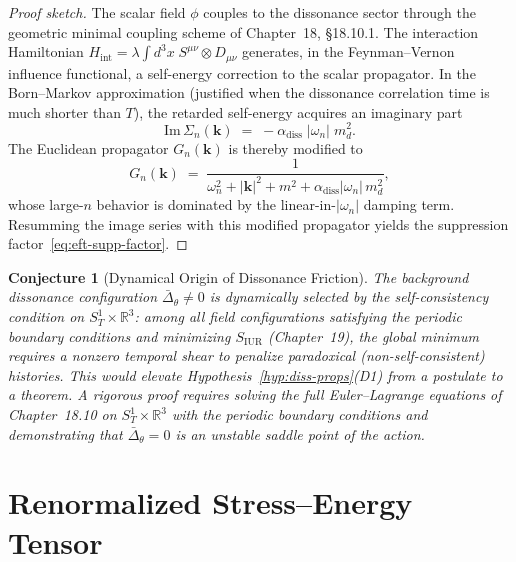 \documentclass[12pt,openany]{book}
\theoremstyle{plain}
\newtheorem{eftconjecture}[efttheorem]{Conjecture}
\theoremstyle{definition}
\theoremstyle{remark}
\providecommand{\abs}[1]{\lvert #1 \rvert}
\providecommand{\diss}{\mathrm{diss}}
\providecommand{\SoneR}{S^{1}_{T}\!\times\!\mathbb{R}^{3}}
\begin{document}
\begin{proof}[Proof sketch]
The scalar field $\phi$ couples to the dissonance sector through the
geometric minimal coupling scheme of Chapter~18, \S18.10.1.
The interaction Hamiltonian
$H_{\mathrm{int}} = \lambda \int d^{3}x\; S^{\mu\nu} \otimes D_{\mu\nu}$
generates, in the Feynman--Vernon influence functional, a self-energy
correction to the scalar propagator.  In the Born--Markov
approximation (justified when the dissonance correlation time is much
shorter than $T$), the retarded self-energy acquires an imaginary part
\begin{equation}\label{eq:eft-self-energy}
  \mathrm{Im}\,\Sigma_{n}(\mathbf{k})
  \;=\;
  -\alpha_{\diss}\;\abs{\omega_{n}}\;m_{d}^{2}.
\end{equation}
The Euclidean propagator $G_{n}(\mathbf{k})$ is thereby modified to
\[
  G_{n}(\mathbf{k})
  \;=\;
  \frac{1}{\omega_{n}^{2}+\abs{\mathbf{k}}^{2}+m^{2}
    + \alpha_{\diss}\abs{\omega_{n}}\,m_{d}^{2}},
\]
whose large-$n$ behavior is dominated by the linear-in-$\abs{\omega_n}$
damping term.  Resumming the image series with this modified propagator
yields the suppression factor~\eqref{eq:eft-supp-factor}.
\end{proof}

\begin{eftconjecture}[Dynamical Origin of Dissonance Friction]
\label{conj:diss-origin}
The background dissonance configuration
$\bar{\Delta}_{\theta} \neq 0$ is dynamically selected by the
self-consistency condition on $\SoneR$: among all field
configurations satisfying the periodic boundary conditions and
minimizing $S_{\mathrm{IUR}}$ (Chapter~19), the global minimum
requires a nonzero temporal shear to penalize paradoxical
(non-self-consistent) histories.  This would elevate
Hypothesis~\ref{hyp:diss-props}(D1) from a postulate to a theorem.
A rigorous proof requires solving the full Euler--Lagrange equations
of Chapter~18.10 on $\SoneR$ with the periodic boundary conditions
and demonstrating that $\bar{\Delta}_{\theta} = 0$ is an unstable
saddle point of the action.
\end{eftconjecture}


\section{Renormalized Stress--Energy Tensor}
\label{sec:eft-Tmunu}
\end{document}
